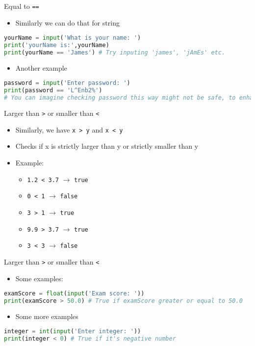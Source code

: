 \documentclass[10pt,xcolor={table,dvipsnames},t]{beamer}
\begin{document}
\begin{frame}[fragile]{Equal to \texttt{==}}
  \begin{itemize}
    \item Similarly we can do that for string
  \end{itemize}
\begin{lstlisting}[language=python]
yourName = input('What is your name: ')
print('yourName is:',yourName)
print(yourName == 'James') # Try inputing 'james', 'jAmEs' etc.
\end{lstlisting}
\begin{itemize}
  \item Another example
\end{itemize}
\begin{lstlisting}[language=python]
password = input('Enter password: ')
print(password == 'L^Enb2%') 
# You can imagine checking password this way might not be safe, to enhance safty people use hashing
\end{lstlisting}
\end{frame}

\begin{frame}{Larger than \texttt{>} or smaller than \texttt{<}}
  \begin{itemize}
    \item Similarly, we have \texttt{x > y} and \texttt{x < y}
    \item Checks if x is strictly larger than y or strictly smaller than y
    \item Example:
    \begin{itemize}
      \item \texttt{1.2 < 3.7} $\rightarrow$ \texttt{true}
      \item \texttt{0 < 1} $\rightarrow$ \texttt{false}
      \item \texttt{3 > 1} $\rightarrow$ \texttt{true}
      \item \texttt{9.9 > 3.7} $\rightarrow$ \texttt{true}
      \item \texttt{3 < 3} $\rightarrow$ \texttt{false} 
    \end{itemize}
  \end{itemize}
\end{frame}

\begin{frame}[fragile]{Larger than \texttt{>} or smaller than \texttt{<}}
  \begin{itemize}
    \item Some examples:
  \end{itemize}
\begin{lstlisting}[language=python]
examScore = float(input('Exam score: '))
print(examScore > 50.0) # True if examScore greater or equal to 50.0
\end{lstlisting}
\begin{itemize}
  \item Some more examples
\end{itemize}
\begin{lstlisting}[language=python]
integer = int(input('Enter integer: '))
print(integer < 0) # True if it's negative number
\end{lstlisting}
\end{frame}
\end{document}
